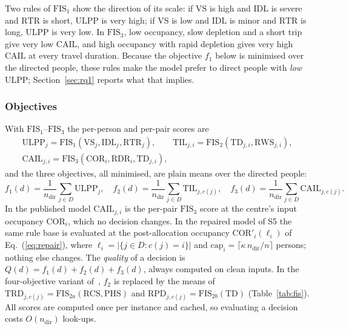 \documentclass[systems,article,submit,moreauthors,pdftex]{Definitions/mdpi}
\begin{document}
Two rules of $\mathrm{FIS}_1$ show the direction of its scale: if $\mathrm{VS}$ is high and
$\mathrm{IDL}$ is severe and $\mathrm{RTR}$ is short, $\mathrm{ULPP}$ is very high; if
$\mathrm{VS}$ is low and $\mathrm{IDL}$ is minor and $\mathrm{RTR}$ is long, $\mathrm{ULPP}$ is
very low. In $\mathrm{FIS}_3$, low occupancy, slow depletion and a short trip give very low
$\mathrm{CAIL}$, and high occupancy with rapid depletion gives very high $\mathrm{CAIL}$ at
every travel duration.
Because the objective $f_1$ below is minimised over the directed people, these rules make the
model prefer to direct people with \emph{low} ULPP; Section~\ref{sec:rq1} reports what that
implies.

\subsubsection{Objectives}
With $\mathrm{FIS}_1$--$\mathrm{FIS}_3$ the per-person and per-pair scores are
\begin{equation}\label{eq:scores}
\begin{gathered}
\mathrm{ULPP}_j=\mathrm{FIS}_1(\mathrm{VS}_j,\mathrm{IDL}_j,\mathrm{RTR}_j),\qquad
\mathrm{TIL}_{j,i}=\mathrm{FIS}_2(\mathrm{TD}_{j,i},\mathrm{RWS}_{j,i}),\\
\mathrm{CAIL}_{j,i}=\mathrm{FIS}_3(\mathrm{COR}_i,\mathrm{RDR}_i,\mathrm{TD}_{j,i}),
\end{gathered}
\end{equation}
and the three objectives, all minimised, are plain means over the directed people:
\begin{equation}\label{eq:objectives}
f_1(d)=\frac{1}{n_{\mathrm{dir}}}\sum_{j\in D}\mathrm{ULPP}_j,\quad
f_2(d)=\frac{1}{n_{\mathrm{dir}}}\sum_{j\in D}\mathrm{TIL}_{j,c(j)},\quad
f_3(d)=\frac{1}{n_{\mathrm{dir}}}\sum_{j\in D}\mathrm{CAIL}_{j,c(j)}.
\end{equation}
In the published model $\mathrm{CAIL}_{j,i}$ is the per-pair $\mathrm{FIS}_3$ score at the
centre's input occupancy $\mathrm{COR}_i$, which no decision changes. In the repaired model of
S5 the same rule base is evaluated at the post-allocation occupancy
$\mathrm{COR}'_i(\ell_i)$ of Eq.~(\ref{eq:repair}), where $\ell_i=|\{j\in D: c(j)=i\}|$ and
$\mathrm{cap}_i=\lceil\kappa\,n_{\mathrm{dir}}/n\rceil$ persons; nothing else changes. The
\emph{quality} of a decision is $Q(d)=f_1(d)+f_2(d)+f_3(d)$, always computed on clean inputs.
In the four-objective variant of~\cite{rabiei2026resilient}, $f_2$ is replaced by the means of
$\mathrm{TRD}_{j,c(j)}=\mathrm{FIS}_{2a}(\mathrm{RCS},\mathrm{PHS})$ and
$\mathrm{RPD}_{j,c(j)}=\mathrm{FIS}_{2b}(\mathrm{TD})$ (Table~\ref{tab:fis}). All scores are
computed once per instance and cached, so evaluating a decision costs $O(n_{\mathrm{dir}})$
look-ups.
\end{document}
